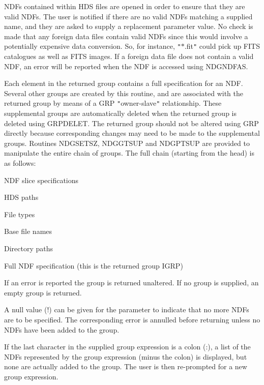 \documentclass[twoside,11pt]{article}
\renewcommand{\_}{\texttt{\symbol{95}}}
\newcommand{\sstitem}{\item}
\newcommand{\sstitem}{\item}
\begin{document}
{{{         \sstitem
         NDFs contained within HDS files are opened in order to ensure
         that they are valid NDFs. The user is notified if there are no
         valid NDFs matching a supplied name, and they are asked to supply
         a replacement parameter value. No check is made that any foreign
         data files contain valid NDFs since this would involve a potentially
         expensive data conversion. So, for instance, {\tt "}$*$.fit{\tt "} could pick up
         FITS catalogues as well as FITS images. If a foreign data file does
         not contain a valid NDF, an error will be reported when the NDF is
         accessed using NDG\_NDFAS.

         \sstitem
         Each element in the returned group contains a full specification
         for an NDF. Several other groups are created by this routine, and
         are associated with the returned group by means of a GRP {\tt "}owner-slave{\tt "}
         relationship. These supplemental groups are automatically deleted
         when the returned group is deleted using GRP\_DELET. The returned
         group should not be altered using GRP directly because corresponding
         changes may need to be made to the supplemental groups. Routines
         NDG\_SETSZ, NDG\_GTSUP and NDG\_PTSUP are provided to manipulate the
         entire chain of groups. The full chain (starting from the head) is
         as follows:

         \sstitem
            NDF slice specifications

         \sstitem
            HDS paths

         \sstitem
            File types

         \sstitem
            Base file names

         \sstitem
            Directory paths

         \sstitem
            Full NDF specification (this is the returned group IGRP)

         \sstitem
         If an error is reported the group is returned unaltered. If
         no group is supplied, an empty group is returned.

         \sstitem
         A null value (!) can be given for the parameter to indicate
         that no more NDFs are to be specified. The corresponding error
         is annulled before returning unless no NDFs have been added to
         the group.

         \sstitem
         If the last character in the supplied group expression is
         a colon (:), a list of the NDFs represented by the group
         expression (minus the colon) is displayed, but none are
         actually added to the group. The user is then re-prompted for
         a new group expression.
      }
   }
}
\end{document}
